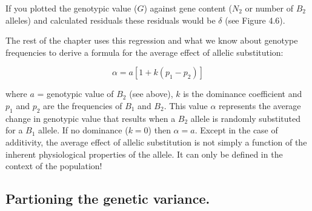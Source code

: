 \documentclass[
]{article}
\begin{document}
If you plotted the genotypic value (\(G\)) against gene content (\(N_2\)
or number of \(B_2\) alleles) and calculated residuals these residuals
would be \(\delta\) (see Figure 4.6).

The rest of the chapter uses this regression and what we know about
genotype frequencies to derive a formula for the average effect of
allelic substitution:

\[ \alpha = a[1 + k(p_1 - p_2)] \]

where \(a\) = genotypic value of \(B_2\) (see above), \(k\) is the
dominance coefficient and \(p_1\) and \(p_2\) are the frequencies of
\(B_1\) and \(B_2\). This value \(\alpha\) represents the average change
in genotypic value that results when a \(B_2\) allele is randomly
substituted for a \(B_1\) allele. If no dominance (\(k = 0\)) then
\(\alpha = a\). Except in the case of additivity, the average effect of
allelic substitution is not simply a function of the inherent
physiological properties of the allele. It can only be defined in the
context of the population!

\hypertarget{partioning-the-genetic-variance.}{%
\subsection{Partioning the genetic
variance.}\label{partioning-the-genetic-variance.}}
\end{document}
